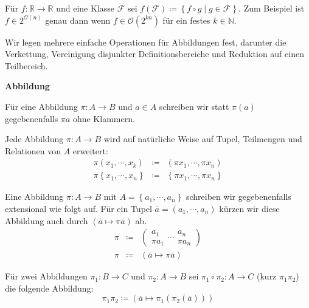 \begin{defn}
Für $f:\mathbb{R}\rightarrow\mathbb{R}$ und eine Klasse $\mathcal{F}$
sei $f\left(\mathcal{F}\right)\coloneqq\left\{ f\circ g\mid g\in\mathcal{F}\right\} $.
Zum Beispiel ist $f\in2^{\mathcal{O}\left(n\right)}$ genau dann wenn
$f\in\mathcal{O}\left(2^{kn}\right)$ für ein festes $k\in\mathbb{N}$.
\end{defn}

Wir legen mehrere einfache Operationen für Abbildungen fest, darunter
die Verkettung, Vereinigung disjunkter Definitionsbereiche und Reduktion
auf einen Teilbereich.
\begin{defn}
\textbf{Abbildung}

Für eine Abbildung $\pi:A\rightarrow B$ und $a\in A$ schreiben wir
statt $\pi\left(a\right)$ gegebenenfalls $\pi a$ ohne Klammern.

Jede Abbildung $\pi:A\rightarrow B$ wird auf natürliche Weise auf
Tupel, Teilmengen und Relationen von $A$ erweitert:
\begin{eqnarray*}
\pi\left(x_{1},\cdots,x_{k}\right) & \coloneqq & \left(\pi x_{1},\cdots,\pi x_{n}\right)\\
\pi\left\{ x_{1},\cdots,x_{n}\right\}  & \coloneqq & \left\{ \pi x_{1},\cdots,\pi x_{n}\right\} 
\end{eqnarray*}

Eine Abbildung $\pi:A\rightarrow B$ mit $A=\left\{ a_{1},\cdots,a_{n}\right\} $
schreiben wir gegebenenfalls extensional wie folgt auf. Für ein Tupel
$\bar{a}=\left(a_{1},\cdots,a_{n}\right)$ kürzen wir diese Abbildung
auch durch $\left(\bar{a}\mapsto\pi\bar{a}\right)$ ab. 
\begin{eqnarray*}
\pi & \coloneqq & \left(\begin{array}{c}
a_{1}\\
\pi a_{1}
\end{array}\cdots\begin{array}{c}
a_{n}\\
\pi a_{n}
\end{array}\right)\\
\pi & \coloneqq & \left(\bar{a}\mapsto\pi\bar{a}\right)
\end{eqnarray*}

Für zwei Abbildungen $\pi_{1}:B\rightarrow C$ und $\pi_{2}:A\rightarrow B$
sei $\pi_{1}\circ\pi_{2}:A\rightarrow C$ (kurz $\pi_{1}\pi_{2}$)
die folgende Abbildung: 
\[
\pi_{1}\pi_{2}\coloneqq\left(\bar{a}\mapsto\pi_{1}\left(\pi_{2}\left(\bar{a}\right)\right)\right)
\]


\end{defn}
